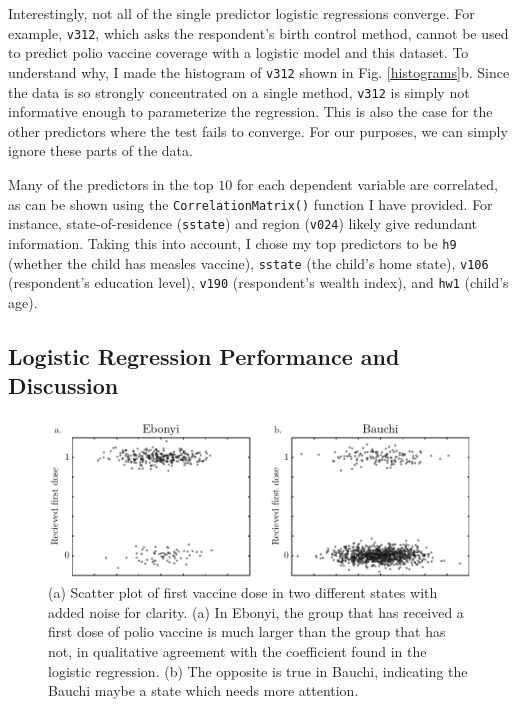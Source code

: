 \documentclass[prl,onecolumn,amsmath,amssymb,superscriptaddress,notitlepage]{revtex4-1}
\begin{document}
Interestingly, not all of the single predictor logistic regressions converge. For example, \verb|v312|, which asks the respondent's birth control method, cannot be used to predict polio vaccine coverage with a logistic model and this dataset. To understand why, I made the histogram of \verb|v312| shown in Fig. \ref{histograms}b. Since the data is so strongly concentrated on a single method, \verb|v312| is simply not informative enough to parameterize the regression. This is also the case for the other predictors where the test fails to converge. For our purposes, we can simply ignore these parts of the data.

Many of the predictors in the top $10$ for each dependent variable are correlated, as can be shown using the \verb|CorrelationMatrix()| function I have provided. For instance, state-of-residence (\verb|sstate|) and region (\verb|v024|) likely give redundant information. Taking this into account, I chose my top predictors to be \verb|h9| (whether the child has measles vaccine), \verb|sstate| (the child's home state), \verb|v106| (respondent's education level), \verb|v190| (respondent's wealth index), and \verb|hw1| (child's age).
 

\subsection{Logistic Regression Performance and Discussion}

\begin{figure}[h!]
\centering
\includegraphics[scale=0.9]{scatter_plots.pdf}
\caption{(a) Scatter plot of first vaccine dose in two different states with added noise for clarity. (a) In Ebonyi, the group that has received a first dose of polio vaccine is much larger than the group that has not, in qualitative agreement with the coefficient found in the logistic regression. (b) The opposite is true in Bauchi, indicating the Bauchi maybe a state which needs more attention.}\label{scatterplots}
\end{figure}
\end{document}
